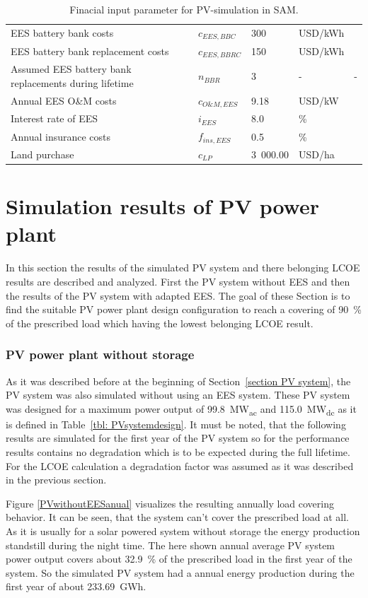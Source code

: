\begin{table}[!h]
\begin{tabular}{  p{5.4cm} C{1.5cm} C{1.5cm}  C{1.7cm}  C{4.0cm} }
EES battery bank costs & $c_{EES,BBC}$ &300 & USD/kWh & \cite{Nykvist2015} \\ 
EES battery bank replacement costs & $c_{EES,BBRC}$ & 150 & USD/kWh & \cite{Zakeri2015} \\ 
Assumed EES battery bank replacements during lifetime & $n_{BBR}$ & 3 & - & - \\ 
Annual EES O\&M costs & $c_{O\&M,EES}$ & 9.18 & USD/kW & \cite{Zakeri2015}\\
Interest rate of EES & $i_{EES}$& 8.0 & \% & \cite{Zakeri2015} \\
Annual insurance costs& $f_{ins,EES}$ & 0.5 & \% & \cite{Cutter2014}\\ \hline
Land purchase &$c_{LP}$ & 3~000.00 & USD/ha & \cite{Cassell2012} \\ 
\hline
\end{tabular}
\caption[Finacial input parameter for PV-simulation in SAM.]{Finacial input parameter for PV-simulation in SAM.}\label{tbl: PVFinance}
\end{table}
\pagebreak
\section{Simulation results of PV power plant}
In this section the results of the simulated PV system and there belonging LCOE results are described and analyzed. First the PV system without EES and then the results of the PV system with adapted EES. The goal of these Section is to find the suitable PV power plant design configuration to reach a covering of 90~\% of the prescribed load which having the lowest belonging LCOE result.
\subsubsection{PV power plant without storage}
As it was described before at the beginning of Section~\ref{section PV system}, the PV system was also simulated without using an EES system. These PV system was designed for a maximum power output of \SI{99.8}{MW}\textsubscript{ac} and \SI{115.0}{MW}\textsubscript{dc} as it is defined in Table~\ref{tbl: PVsystemdesign}. It must be noted, that the following results are simulated for the first year of the PV system so for the performance results contains no degradation which is to be expected during the full lifetime. For the LCOE calculation a degradation factor was assumed as it was described in the previous section. 

Figure \ref{PVwithoutEESanual} visualizes the resulting annually load covering behavior. It can be seen, that the system can't cover the prescribed load at all. As it is usually for a solar powered system without storage the energy production standstill during the night time. The here shown annual average PV system power output covers about 32.9~\% of the prescribed load in the first year of the system. So the simulated PV system had a annual energy production during the first year of about \SI{233.69}{GWh}.

